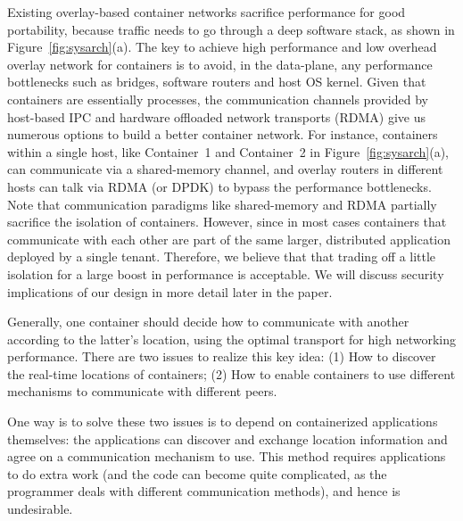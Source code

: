 Existing overlay-based container networks sacrifice performance for good
portability, because traffic needs to go through a deep software stack, as shown
in Figure~\ref{fig:sysarch}(a).  The key to achieve high performance and low
overhead overlay network for containers is to avoid, in the data-plane, any
performance bottlenecks such as bridges, software routers and host OS kernel.
Given that containers are essentially processes, the communication channels
provided by host-based IPC and hardware offloaded network transports (RDMA) give
us numerous options to build a better container network. For instance,
containers within a single host, like Container~1 and Container~2 in
Figure~\ref{fig:sysarch}(a), can communicate via a shared-memory channel, and
overlay routers in different hosts can talk via RDMA (or DPDK) to
bypass the performance bottlenecks. Note that communication paradigms like
shared-memory and RDMA partially sacrifice the isolation of containers. However,
since in most cases containers that communicate with each other are part of the
same larger, distributed application deployed by a single tenant. Therefore, we
believe that that trading off a little isolation for a large boost in
performance is acceptable.  We will discuss security implications of our design
in more detail later in the paper.


Generally, one container should decide how to communicate with another according
to the latter's location, using the optimal transport for high networking
performance.  There are two issues to realize this key idea: (1) How to discover
the real-time locations of containers; (2) How to enable containers to use
different mechanisms to communicate with different peers.

One way is to solve these two issues is to depend on containerized applications
themselves: the applications can discover and exchange location information and
agree on a communication mechanism to use. This method requires applications to
do extra work (and the code can become quite complicated, as the programmer
deals with different communication methods), and hence is undesirable. 

